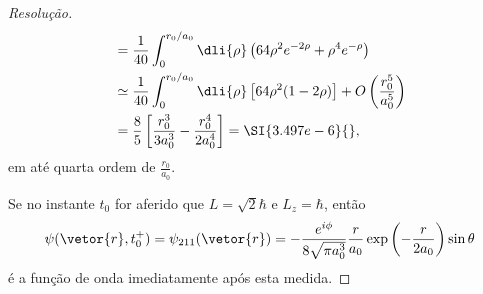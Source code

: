 \begin{proof}[Resolução]
\begin{align*}
               &= \frac{1}{40} \int_0^{r_0/a_0} \dli{\rho} \left(64 \rho^2 e^{-2\rho} + \rho^4 e^{-\rho}\right)\\
               &\simeq \frac{1}{40} \int_0^{r_0/a_0} \dli{\rho} \left[64 \rho^2(1 - 2\rho)\right] + O\left(\frac{r_0^5}{a_0^5}\right)\\
               &= \frac{8}{5}\left[\frac{r_0^3}{3a_0^3} - \frac{r_0^4}{2a_0^4}\right] = \SI{3.497e-6}{},
    \end{align*}
    em até quarta ordem de \(\frac{r_0}{a_0}\).

    Se no instante \(t_0\) for aferido que \(L = \sqrt{2}\hbar\) e \(L_z = \hbar\), então
    \begin{equation*}
        \psi(\vetor{r}, t_0^+) = \psi_{211}(\vetor{r}) = -\frac{e^{i\phi}}{8\sqrt{\pi a_0^3}} \frac{r}{a_0} \exp\left(-\frac{r}{2a_0}\right) \sin\theta
    \end{equation*}
    é a função de onda imediatamente após esta medida.
\end{proof}

